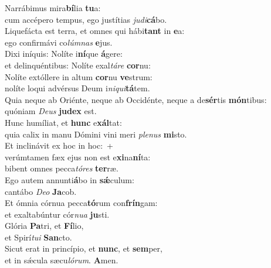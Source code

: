 \evenverse Narrábimus mira\textbf{bí}lia \textbf{tu}a:~\*\\
\evenverse cum accépero tempus, ego justítias \textit{ju}\textit{di}\textbf{cá}bo.\\
\oddverse Liquefácta est terra, et omnes qui hábi\textbf{tant} in \textbf{e}a:~\*\\
\oddverse ego confirmávi co\textit{lúm}\textit{nas} \textbf{e}jus.\\
\evenverse Dixi iníquis: Nolíte i\textbf{ní}que \textbf{á}gere:~\*\\
\evenverse et delinquéntibus: Nolíte exal\textit{tá}\textit{re} \textbf{cor}nu:\\
\oddverse Nolíte extóllere in altum \textbf{cor}nu \textbf{ve}strum:~\*\\
\oddverse nolíte loqui advérsus Deum i\textit{ni}\textit{qui}\textbf{tá}tem.\\
\evenverse Quia neque ab Oriénte, neque ab Occidénte, neque a de\textbf{sér}tis \textbf{món}tibus:~\*\\
\evenverse quóniam \textit{De}\textit{us} \textbf{ju}\textbf{dex} est.\\
\oddverse Hunc humíliat, et \textbf{hunc} e\textbf{xál}tat:~\*\\
\oddverse quia calix in manu Dómini vini meri \textit{ple}\textit{nus} \textbf{mi}sto.\\
\evenverse Et inclinávit ex hoc in hoc:~+\\
\evenverse  verúmtamen fæx ejus non est e\textbf{xi}na\textbf{ní}ta:~\*\\
\evenverse bibent omnes pecca\textit{tó}\textit{res} \textbf{ter}ræ.\\
\oddverse Ego autem annunti\textbf{á}bo in \textbf{sǽ}culum:~\*\\
\oddverse cantábo \textit{De}\textit{o} \textbf{Ja}cob.\\
\evenverse Et ómnia córnua pecca\textbf{tó}rum con\textbf{frín}gam:~\*\\
\evenverse et exaltabúntur cór\textit{nu}\textit{a} \textbf{ju}sti.\\
\oddverse Glória \textbf{Pa}tri, et \textbf{Fí}lio,~\*\\
\oddverse et Spirí\textit{tu}\textit{i} \textbf{San}cto.\\
\evenverse Sicut erat in princípio, et \textbf{nunc}, et \textbf{sem}per,~\*\\
\evenverse et in sǽcula sæcu\textit{ló}\textit{rum}. \textbf{A}men.\\
